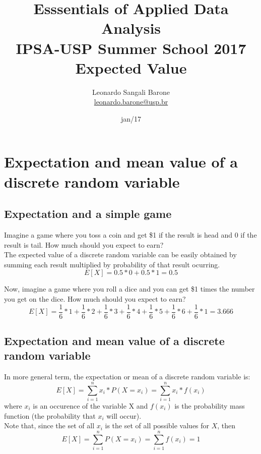 \documentclass[11pt]{article}
\title{\textbf{Esssentials of Applied Data Analysis\\
				IPSA-USP Summer School 2017}\newline\\
				Expected Value}
\author{Leonardo Sangali Barone\\ \href{leonardo.barone@usp.br}{leonardo.barone@usp.br}}
\date{jan/17}
\begin{document}
\maketitle

\section*{Expectation and mean value of a discrete random variable}


	\subsection*{Expectation and a simple game}

	Imagine a game where you toss a coin and get \$1 if the result is head and 0 if the result is tail. How much should you expect to earn?\\
		
	The expected value of a discrete random variable can be easily obtained by summing each result multiplied by probability of that result ocurring.\\
	
	\[E[X] = 0.5 * 0 + 0.5 * 1 = 0.5\]

	Now, imagine a game where you roll a dice and you can get \$1 times the number you get on the dice. How much should you expect to earn?\\

\[E[X] = \frac{1}{6} * 1 + \frac{1}{6} * 2 + \frac{1}{6} * 3 + \frac{1}{6} * 4 + \frac{1}{6} * 5 + \frac{1}{6} * 6 + \frac{1}{6} * 1 = 3.666\]


	\subsection*{Expectation and mean value of a discrete random variable}

	In more general term, the expectation or mean of a discrete random variable is:
	\[E[X] = \sum\limits_{i=1}^n x_i * P(X = x_i) = \sum\limits_{i=1}^n x_i * f(x_i)\]
where $x_i$ is an occurence of the variable X and $f(x_i)$ is the probability mass function (the probability that $x_i$ will occur).\\

	Note that, since the set of all $x_i$ is the set of all possible values for $X$, then
	\[E[X] = \sum\limits_{i=1}^n P(X = x_i) = \sum\limits_{i=1}^n f(x_i) = 1\]
\end{document}

